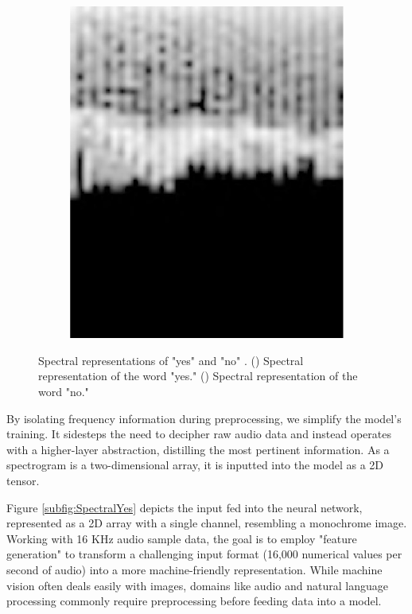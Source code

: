 \begin{figure}[h!]
\begin{subfigure}{0.45\textwidth}
		\includegraphics[width=\linewidth]{Images/DataMining/SpectrogramNo.jpg}
		\caption{}    %
		\label{subfig:SpectralsNo}
	\end{subfigure}
	
	\caption{Spectral representations of "yes" and "no" \cite{Warden:2019}. () Spectral representation of the word "yes." () Spectral representation of the word "no."}
	\label{fig:SpectralYesNoCombined}
\end{figure}

By isolating frequency information during preprocessing, we simplify the model's training. It sidesteps the need to decipher raw audio data and instead operates with a higher-layer abstraction, distilling the most pertinent information. As a spectrogram is a two-dimensional array, it is inputted into the model as a 2D tensor.

Figure \ref{subfig:SpectralYes} depicts the input fed into the neural network, represented as a 2D array with a single channel, resembling a monochrome image. Working with 16 KHz audio sample data, the goal is to employ "feature generation" to transform a challenging input format (16,000 numerical values per second of audio) into a more machine-friendly representation. While machine vision often deals easily with images, domains like audio and natural language processing commonly require preprocessing before feeding data into a model.


